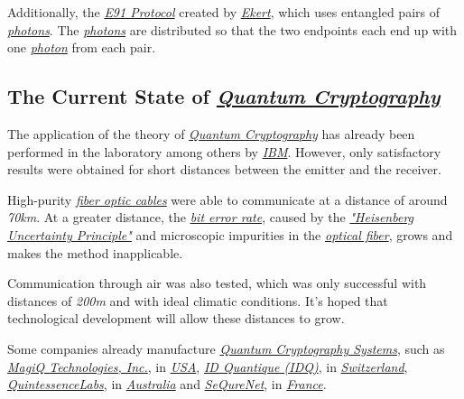 \documentclass[conference]{IEEEtran}
\begin{document}
\vspace{4pt}

Additionally, the \href{https://en.wikipedia.org/wiki/Quantum_key_distribution#E91_protocol:_Artur_Ekert_.281991.29}{\textit{E91 Protocol}} created by \href{https://en.wikipedia.org/wiki/Artur_Ekert}{\textit{Ekert}}, which uses entangled pairs of \href{https://en.wikipedia.org/wiki/Photon}{\textit{photons}}. The \href{https://en.wikipedia.org/wiki/Photon}{\textit{photons}} are distributed so that the two endpoints each end up with one \href{https://en.wikipedia.org/wiki/Photon}{\textit{photon}} from each pair.

\newpage

\subsection{The Current State of \href{https://en.wikipedia.org/wiki/Quantum_cryptography}{\textit{Quantum Cryptography}}}

The application of the theory of \href{https://en.wikipedia.org/wiki/Quantum_cryptography}{\textit{Quantum Cryptography}} has already been performed in the laboratory among others by \href{https://en.wikipedia.org/wiki/IBM}{\textit{IBM}}. However, only satisfactory results were obtained for short distances between the emitter and the receiver.

\vspace{4pt}

High-purity \href{https://en.wikipedia.org/wiki/Optical_fiber}{\textit{fiber optic cables}} were able to communicate at a distance of around \textit{70km}. At a greater distance, the \href{https://en.wikipedia.org/wiki/Bit_error_rate}{\textit{bit error rate}}, caused by the \href{https://en.wikipedia.org/wiki/Uncertainty_principle}{\textit{"Heisenberg Uncertainty Principle"}} and microscopic impurities in the \href{https://en.wikipedia.org/wiki/Optical_fiber}{\textit{optical fiber}}, grows and makes the method inapplicable.

\vspace{4pt}

Communication through air was also tested, which was only successful with distances of \textit{200m} and with ideal climatic conditions. It's hoped that technological development will allow these distances to grow.

\vspace{4pt}

Some companies already manufacture \href{https://en.wikipedia.org/wiki/Cryptosystem}{\textit{Quantum Cryptography Systems}}, such as \href{https://en.wikipedia.org/wiki/MagiQ_Technologies,_Inc.}{\textit{MagiQ Technologies, Inc.}}, in \href{https://en.wikipedia.org/wiki/United_States}{\textit{USA}}, \href{https://www.idquantique.com/}{\textit{ID Quantique (IDQ)}}, in \href{https://en.wikipedia.org/wiki/Switzerland}{\textit{Switzerland}}, \href{https://en.wikipedia.org/wiki/QuintessenceLabs}{\textit{QuintessenceLabs}}, in \href{https://en.wikipedia.org/wiki/Australia}{\textit{Australia}} and \href{https://www.cbinsights.com/company/sequrenet}{\textit{SeQureNet}}, in \href{https://en.wikipedia.org/wiki/France}{\textit{France}}.
\end{document}

